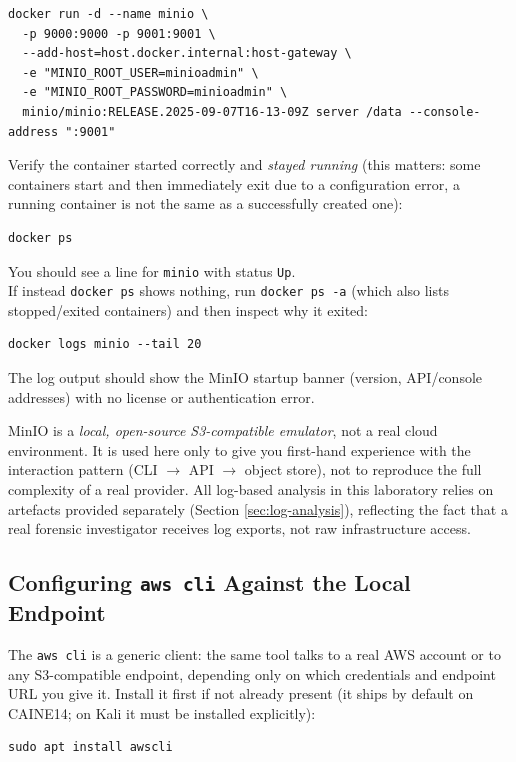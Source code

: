 \begin{lstlisting}
docker run -d --name minio \
  -p 9000:9000 -p 9001:9001 \
  --add-host=host.docker.internal:host-gateway \
  -e "MINIO_ROOT_USER=minioadmin" \
  -e "MINIO_ROOT_PASSWORD=minioadmin" \
  minio/minio:RELEASE.2025-09-07T16-13-09Z server /data --console-address ":9001"
\end{lstlisting}

\noindent
Verify the container started correctly and \emph{stayed running} (this matters: some containers start and then immediately exit due to a configuration error, a running container is not the same as a successfully created one):

\begin{lstlisting}
docker ps
\end{lstlisting}
You should see a line for \texttt{minio} with status \texttt{Up}.\\
If instead \texttt{docker ps} shows nothing, run \texttt{docker ps -a} (which also lists stopped/exited  containers) and then inspect why it exited:

\begin{lstlisting} 
docker logs minio --tail 20
\end{lstlisting}

\noindent
The log output should show the MinIO startup banner (version, API/console addresses) with no
license or authentication error.

\begin{warningbox}
MinIO is a \emph{local, open-source S3-compatible emulator}, not a real cloud environment. It is used here only to give you first-hand experience with the interaction pattern (CLI $\rightarrow$ API $\rightarrow$ object store), not to reproduce the full complexity of a real provider. All log-based analysis in this laboratory relies on artefacts provided separately (Section \ref{sec:log-analysis}), reflecting the fact that a real forensic investigator receives log exports, not raw infrastructure access.
\end{warningbox}

\subsection{Configuring \texttt{aws cli} Against the Local Endpoint}

The \texttt{aws cli} is a generic client: the same tool talks to a real AWS account or to any
S3-compatible endpoint, depending only on which credentials and endpoint URL you give it. Install
it first if not already present (it ships by default on CAINE14; on Kali it must be installed
explicitly):
\begin{lstlisting}
sudo apt install awscli
\end{lstlisting}

